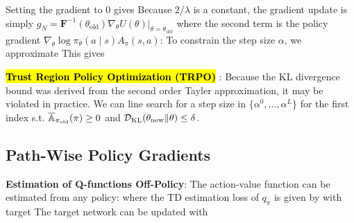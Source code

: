 \documentclass{article}
\begin{document}
  Setting the gradient to $0$ gives
  Because $2/\lambda$ is a constant, the gradient update is simply $g_N=\mathbf{F}^{-1}(\theta_\text{old})\nabla_\theta U(\theta)\vert_{\theta=\theta_\text{old}}$ where the second term is the policy gradient $\nabla_\theta \log \pi_\theta(a\mid s)A_\pi(s,a)$:
  To constrain the step size $\alpha$, we approximate 
  This gives

  \hl{\textbf{Trust Region Policy Optimization (TRPO)}} \cite{schulman2015trust}: Because the KL divergence bound was derived from the second order Tayler approximation, it may be violated in practice. We can line search for a step size in $\{\alpha^0, \dots, \alpha^L\}$ for the first index s.t. $\overline{\mathbb{A}}_{\pi_\text{old}}(\pi)\geq 0$ and $\mathcal{D}_\text{KL}(\theta_\text{new}\Vert \theta)\leq\delta$. 

\subsection{Path-Wise Policy Gradients}

  \textbf{Estimation of Q-functions Off-Policy}: The action-value function can be estimated from any policy:
  where the TD estimation loss of $q_\pi$ is given by
  with target
  The target network can be updated with
\end{document}
